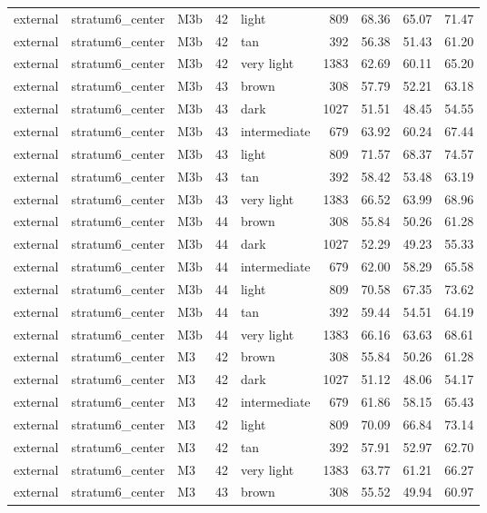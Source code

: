 \begin{tabular}{lllrlrrrr}
external & stratum6\_center & M3b & 42 & light & 809 & 68.36 & 65.07 & 71.47 \\
external & stratum6\_center & M3b & 42 & tan & 392 & 56.38 & 51.43 & 61.20 \\
external & stratum6\_center & M3b & 42 & very light & 1383 & 62.69 & 60.11 & 65.20 \\
external & stratum6\_center & M3b & 43 & brown & 308 & 57.79 & 52.21 & 63.18 \\
external & stratum6\_center & M3b & 43 & dark & 1027 & 51.51 & 48.45 & 54.55 \\
external & stratum6\_center & M3b & 43 & intermediate & 679 & 63.92 & 60.24 & 67.44 \\
external & stratum6\_center & M3b & 43 & light & 809 & 71.57 & 68.37 & 74.57 \\
external & stratum6\_center & M3b & 43 & tan & 392 & 58.42 & 53.48 & 63.19 \\
external & stratum6\_center & M3b & 43 & very light & 1383 & 66.52 & 63.99 & 68.96 \\
external & stratum6\_center & M3b & 44 & brown & 308 & 55.84 & 50.26 & 61.28 \\
external & stratum6\_center & M3b & 44 & dark & 1027 & 52.29 & 49.23 & 55.33 \\
external & stratum6\_center & M3b & 44 & intermediate & 679 & 62.00 & 58.29 & 65.58 \\
external & stratum6\_center & M3b & 44 & light & 809 & 70.58 & 67.35 & 73.62 \\
external & stratum6\_center & M3b & 44 & tan & 392 & 59.44 & 54.51 & 64.19 \\
external & stratum6\_center & M3b & 44 & very light & 1383 & 66.16 & 63.63 & 68.61 \\
external & stratum6\_center & M3 & 42 & brown & 308 & 55.84 & 50.26 & 61.28 \\
external & stratum6\_center & M3 & 42 & dark & 1027 & 51.12 & 48.06 & 54.17 \\
external & stratum6\_center & M3 & 42 & intermediate & 679 & 61.86 & 58.15 & 65.43 \\
external & stratum6\_center & M3 & 42 & light & 809 & 70.09 & 66.84 & 73.14 \\
external & stratum6\_center & M3 & 42 & tan & 392 & 57.91 & 52.97 & 62.70 \\
external & stratum6\_center & M3 & 42 & very light & 1383 & 63.77 & 61.21 & 66.27 \\
external & stratum6\_center & M3 & 43 & brown & 308 & 55.52 & 49.94 & 60.97 \\

\end{tabular}

